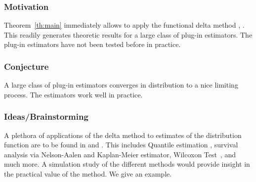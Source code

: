 \subsubsection{Motivation}
Theorem~\ref{th:main}
immediately allows to apply the functional delta method \cite[§3.9]{vaart2013}, \cite[§20]{Vaart2000}.
This readily generates theoretic results for a large class of plug-in estimators. The plug-in estimators have not been tested before in practice.
\subsubsection{Conjecture}
A large class of plug-in estimators converges in distribution to a nice limiting process.
The estimators work well in practice.
\subsubsection{Ideas/Brainstorming}
A plethora of applications of the delta method to estimates of the distribution function are to be found in \cite{Vaart2000} and \cite{vaart2013}.
This includes Quantile estimation \cite[§21]{Vaart2000}\cite[§3.9.21/24]{vaart2013},
survival analysis via Nelson-Aalen and Kaplan-Meier estimator\cite[§3.9.19/31]{vaart2013},
Wilcoxon Test~\cite[§3.9.4.1]{vaart2013},
and much more.
A simulation study of the different methods would provide insight in the practical value of the method. 
We give an example.


